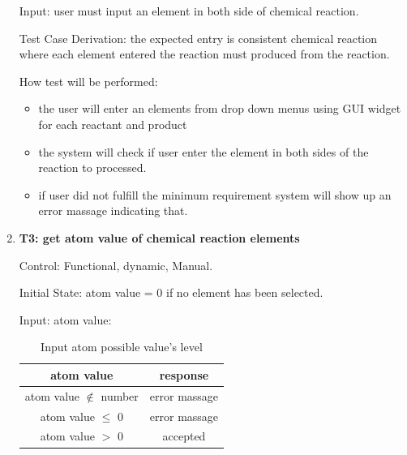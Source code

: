 \documentclass[12pt, titlepage]{article}
\begin{document}
\begin{enumerate}
Input: user must input an element in both side of chemical reaction.

\begin{table}[h!]
\centering
{}
\caption{Input name of element possible entries and its corresponding outputs }
\label{elementname}
\end{table}

Test Case Derivation: the expected entry is consistent chemical reaction where each element entered the reaction must produced from the reaction. 

How test will be performed: 
\begin{itemize}
\item the user will enter an elements from drop down menus using GUI widget for each reactant and product
\item the system will check if user enter the element in both sides of the reaction to processed. 
\item if user did not fulfill the minimum requirement system will show up an error massage indicating that. 
\end{itemize}

\item{\bf T3: get atom value of chemical reaction elements \\}

Control: Functional, dynamic, Manual.
					
Initial State: atom value = 0 if no element has been selected.
					
Input: 
atom value: 
\begin{table}[h!]
\centering
\begin{tabular}{|c|c|}
\hline
atom value & response  \\
\hline
atom value $\notin$ number  & error massage \\ \hline
atom value $\leq$ 0& error massage \\ \hline
atom value $>$ 0  & accepted\\ \hline
\hline
\end{tabular}
\caption{Input atom possible value's level}
\label{atom}
\end{table}
	

\end{enumerate}
\end{document}

